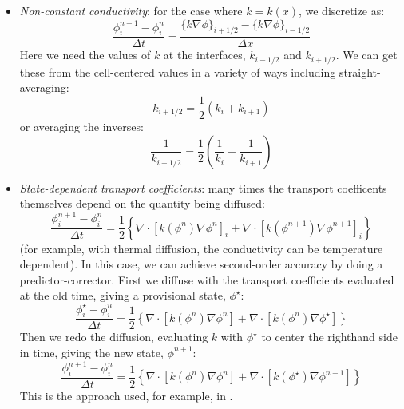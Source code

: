 \begin{itemize}

\item {\em Non-constant conductivity}: for the case where $k = k(x)$,
  we discretize as:
  \begin{equation}
  \frac{\phi_i^{n+1} - \phi_i^n}{\Delta t} = 
        \frac{ \{ k \nabla \phi \}_{i+1/2} -
               \{ k \nabla \phi \}_{i-1/2}}{\Delta x}
  \end{equation}
 Here we need the values of $k$ at the interfaces, $k_{i-1/2}$ and
 $k_{i+1/2}$.  We can get these from the cell-centered values in a
 variety of ways including straight-averaging:
 \begin{equation}
 k_{i+1/2} = \frac{1}{2} (k_i + k_{i+1})
 \end{equation}
 or averaging the inverses:
 \begin{equation}
 \frac{1}{k_{i+1/2}} = \frac{1}{2} \left (\frac{1}{k_i} + \frac{1}{k_{i+1}} \right )
 \end{equation}
 
\item {\em State-dependent transport coefficients}: many times the
  transport coefficents themselves depend on the quantity being
  diffused:
  \begin{equation}
  \frac{\phi_i^{n+1} - \phi_i^n}{\Delta t} = 
        \frac{1}{2} \left \{
               \nabla \cdot [ k(\phi^n) \nabla \phi^n ]_i +
               \nabla \cdot [ k(\phi^{n+1}) \nabla \phi^{n+1} ]_i 
               \right \}
  \end{equation}
  (for example, with thermal diffusion, the conductivity can
  be temperature dependent).  In this case, we can achieve second-order
  accuracy by doing a predictor-corrector.  First we diffuse with
  the transport coefficients evaluated at the old time, giving a provisional
  state, $\phi^\star$:
  \begin{equation}
  \frac{\phi_i^\star - \phi_i^n}{\Delta t} = 
        \frac{1}{2} \left \{
               \nabla \cdot [ k(\phi^n) \nabla \phi^n ] +
               \nabla \cdot [ k(\phi^n) \nabla \phi^\star ] 
               \right \}
  \end{equation}
  Then we redo the diffusion, evaluating $k$ with $\phi^\star$ to
  center the righthand side in time, giving the new state, $\phi^{n+1}$:
  \begin{equation}
  \frac{\phi_i^{n+1} - \phi_i^n}{\Delta t} = 
        \frac{1}{2} \left \{
               \nabla \cdot [ k(\phi^n) \nabla \phi^n ] +
               \nabla \cdot [ k(\phi^\star) \nabla \phi^{n+1} ] 
               \right \}
  \end{equation}
  This is the approach used, for example, in \cite{SNpaper}.



\end{itemize}
